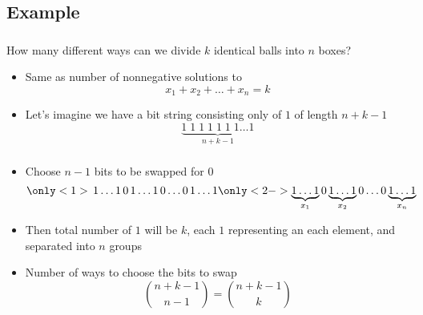 \documentclass[10pt]{beamer}
\newcommand{\bi}{\begin{itemize}}
\newcommand{\ei}{\end{itemize}}
\begin{document}
\subsection{Example}
\begin{frame}
  \frametitle{\insertsubsection}
  \vspace{30pt}
  How many different ways can we divide $k$ identical balls into $n$ boxes?
  \bi
    \item Same as number of nonnegative solutions to
      \[
        x_1 + x_2 + \ldots + x_n = k
      \]
    \item Let's imagine we have a bit string consisting only of $1$ of length $n+k-1$
      \[
        \underbrace{1\;1\;1\;1\;1\;1\;1\ldots1}_{n+k-1}
      \]
  \ei
\end{frame}

\begin{frame}
  \frametitle{\insertsubsection}
  \vspace{20pt}
  \bi
    \item Choose $n-1$ bits to be swapped for $0$
      \[
        \only<1>{\,1\ldots1\,0\,1\ldots1\,0\ldots0\,1\ldots1}
        \only<2->{\underbrace{1\ldots1}_{x_1}0\underbrace{1\ldots1}_{x_2}0\ldots0\underbrace{1\ldots1}_{x_n}}
      \]
    \item Then total number of $1$ will be $k$, each $1$ representing an each element, and separated into $n$ groups
    \item Number of ways to choose the bits to swap
      \[
        \binom{n+k-1}{n-1} = \binom{n+k-1}{k}
      \]
  \ei
\end{frame}
\end{document}
